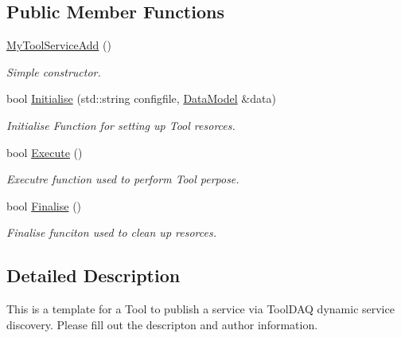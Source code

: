 \subsection*{Public Member Functions}
\begin{DoxyCompactItemize}
\item 
\hypertarget{classMyToolServiceAdd_a74ea27af61207cb9542f569e5669f013}{\hyperlink{classMyToolServiceAdd_a74ea27af61207cb9542f569e5669f013}{My\-Tool\-Service\-Add} ()}\label{classMyToolServiceAdd_a74ea27af61207cb9542f569e5669f013}

\begin{DoxyCompactList}\small\item\em Simple constructor. \end{DoxyCompactList}\item 
bool \hyperlink{classMyToolServiceAdd_a4b97306d13efe59a0a4cc8ca0f1560ea}{Initialise} (std\-::string configfile, \hyperlink{classDataModel}{Data\-Model} \&data)
\begin{DoxyCompactList}\small\item\em Initialise Function for setting up Tool resorces. \end{DoxyCompactList}\item 
\hypertarget{classMyToolServiceAdd_a876f8dac7b415b064d09687abac8e296}{bool \hyperlink{classMyToolServiceAdd_a876f8dac7b415b064d09687abac8e296}{Execute} ()}\label{classMyToolServiceAdd_a876f8dac7b415b064d09687abac8e296}

\begin{DoxyCompactList}\small\item\em Executre function used to perform Tool perpose. \end{DoxyCompactList}\item 
\hypertarget{classMyToolServiceAdd_a7ce3453fe2e9e626f6b47a10aa2d1050}{bool \hyperlink{classMyToolServiceAdd_a7ce3453fe2e9e626f6b47a10aa2d1050}{Finalise} ()}\label{classMyToolServiceAdd_a7ce3453fe2e9e626f6b47a10aa2d1050}

\begin{DoxyCompactList}\small\item\em Finalise funciton used to clean up resorces. \end{DoxyCompactList}\end{DoxyCompactItemize}


\subsection{Detailed Description}
This is a template for a Tool to publish a service via Tool\-D\-A\-Q dynamic service discovery. Please fill out the descripton and author information.

